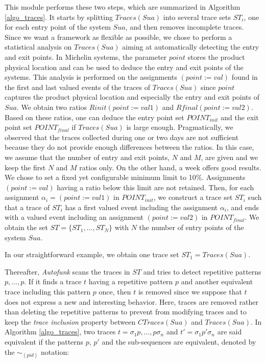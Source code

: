 This module performs these two steps, which are summarized in
Algorithm \ref{algo_traces}. It starts by splitting $Traces(Sua)$
into several trace sets $ST_i$, one for each entry point of the
system $\mathit{Sua}$, and then removes incomplete traces. Since
we want a framework as flexible as possible, we chose to perform
a statistical analysis on $Traces(Sua)$ aiming at automatically
detecting the entry and exit points.  In Michelin systems, the
parameter $point$ stores the product physical location and can be
used to deduce the entry and exit points of the systems.
This analysis is performed on the assignments $(point:=val)$
found in the first and last valued events of the traces of
$Traces(Sua)$ since $point$ captures the product physical
location and especially the entry and exit points of $\mathit{Sua}$.
We obtain two ratios $Rinit(point:=val1)$ and
$Rfinal(point:=val2)$.  Based on these ratios, one can deduce the
entry point set $POINT_{init}$ and the exit point set
$POINT_{final}$ if $Traces(Sua)$ is large enough. Pragmatically,
we observed that the traces collected during one or two days are
not sufficient because they do not provide enough differences
between the ratios. In this case, we assume that the number of
entry and exit points, $N$ and $M$, are given and we keep the
first $N$ and $M$ ratios only. On the other hand, a week offers
good results. We chose to set a fixed yet configurable
minimum limit to 10\%. Assignments $(point:=val)$ having a ratio
below this limit are not retained. Then, for each assignment
$\alpha_i=(point:=val1)$ in $POINT_{init}$, we construct a trace
set $ST_i$ such that a trace of $ST_i$ has a first valued event
including the assignment $\alpha_i$, and ends with a valued event
including an assignment $(point:=val2)$ in $POINT_{final}$. We
obtain the set $ST=\{ST_1,...,ST_N\}$ with $N$ the number of
entry points of the system $\mathit{Sua}$.

In our straightforward example, we obtain one trace set
$ST_1=Traces(Sua)$.

Thereafter, \textit{Autofunk} scans the traces in $ST$ and tries
to detect repetitive patterns $p,\dots,p$. If it finds a trace
$t$ having a repetitive pattern $p$ and another equivalent trace
including this pattern $p$ once, then $t$ is removed since we
suppose that $t$ does not express a new and interesting behavior.
Here, traces are removed rather than deleting the repetitive
patterns to prevent from modifying traces and to keep the
\emph{trace inclusion} \cite{petrenko06} property between
$CTraces(Sua)$ and $Traces(Sua)$.  In Algorithm
\ref{algo_traces}, two traces $t=\sigma_1 p,\dots,p \sigma_n$ and
$t'=\sigma_1 p' \sigma_n$ are said equivalent if the patterns
$p$, $p'$ and the sub-sequences are equivalent, denoted by the
$\sim_{(pid)}$ notation:

